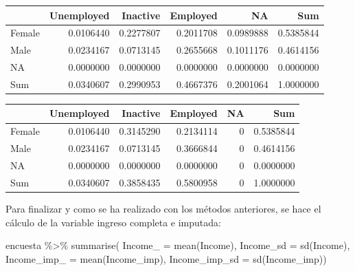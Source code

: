 \documentclass[
  12pt,
]{book}
\newenvironment{Shaded}{\begin{snugshade}}{\end{snugshade}}
\newcommand{\AttributeTok}[1]{\textcolor[rgb]{0.77,0.63,0.00}{#1}}
\newcommand{\FunctionTok}[1]{\textcolor[rgb]{0.00,0.00,0.00}{#1}}
\newcommand{\NormalTok}[1]{#1}
\newcommand{\SpecialCharTok}[1]{\textcolor[rgb]{0.00,0.00,0.00}{#1}}
\newcommand{\StringTok}[1]{\textcolor[rgb]{0.31,0.60,0.02}{#1}}
\begin{document}
\begin{tabular}{l|r|r|r|r|r}
\hline
  & Unemployed & Inactive & Employed & NA & Sum\\
\hline
Female & 0.0106440 & 0.2277807 & 0.2011708 & 0.0989888 & 0.5385844\\
\hline
Male & 0.0234167 & 0.0713145 & 0.2655668 & 0.1011176 & 0.4614156\\
\hline
NA & 0.0000000 & 0.0000000 & 0.0000000 & 0.0000000 & 0.0000000\\
\hline
Sum & 0.0340607 & 0.2990953 & 0.4667376 & 0.2001064 & 1.0000000\\
\hline
\end{tabular}

\begin{Shaded}
\end{Shaded}

\begin{tabular}{l|r|r|r|r|r}
\hline
  & Unemployed & Inactive & Employed & NA & Sum\\
\hline
Female & 0.0106440 & 0.3145290 & 0.2134114 & 0 & 0.5385844\\
\hline
Male & 0.0234167 & 0.0713145 & 0.3666844 & 0 & 0.4614156\\
\hline
NA & 0.0000000 & 0.0000000 & 0.0000000 & 0 & 0.0000000\\
\hline
Sum & 0.0340607 & 0.3858435 & 0.5800958 & 0 & 1.0000000\\
\hline
\end{tabular}

Para finalizar y como se ha realizado con los métodos anteriores, se hace el cálculo de la variable ingreso completa e imputada:

\begin{Shaded}
\begin{Highlighting}[]
\NormalTok{encuesta }\SpecialCharTok{\%\textgreater{}\%} \FunctionTok{summarise}\NormalTok{(}
  \AttributeTok{Income\_ =} \FunctionTok{mean}\NormalTok{(Income),}
  \AttributeTok{Income\_sd =} \FunctionTok{sd}\NormalTok{(Income),}
  \AttributeTok{Income\_imp\_ =} \FunctionTok{mean}\NormalTok{(Income\_imp),}
  \AttributeTok{Income\_imp\_sd =} \FunctionTok{sd}\NormalTok{(Income\_imp))}
\end{Highlighting}
\end{Shaded}
\end{document}
